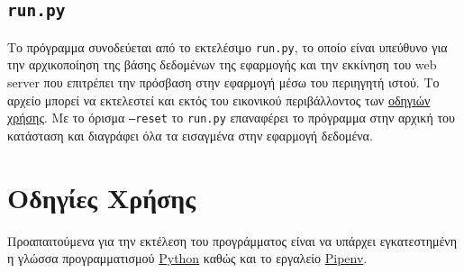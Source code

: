 \documentclass[11pt,a4paper,titlepage]{article}
\numberwithin{equation}{section}
\begin{document}
\subsection{\texttt{run.py}}
Το πρόγραμμα συνοδεύεται από το εκτελέσιμο \texttt{run.py}, το οποίο είναι υπεύθυνο για την αρχικοποίηση της βάσης δεδομένων της εφαρμογής και την εκκίνηση του web server που επιτρέπει την πρόσβαση στην εφαρμογή μέσω του περιηγητή ιστού. Το αρχείο μπορεί να εκτελεστεί και εκτός του εικονικού περιβάλλοντος των \hyperref[sec:instructions]{οδηγιών χρήσης}. Με το όρισμα \texttt{--reset} το \texttt{run.py} επαναφέρει το πρόγραμμα στην αρχική του κατάσταση και διαγράφει όλα τα εισαγμένα στην εφαρμογή δεδομένα.

\section{Οδηγίες Χρήσης}
\label{sec:instructions}

Προαπαιτούμενα για την εκτέλεση του προγράμματος είναι να υπάρχει εγκατεστημένη η γλώσσα προγραμματισμού \href{https://www.python.org/downloads/}{Python} καθώς και το εργαλείο \href{https://pipenv.pypa.io/en/latest/install/}{Pipenv}.
\end{document}
